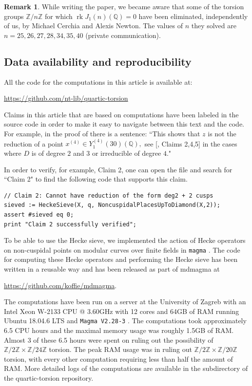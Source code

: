 \documentclass[11pt,reqno]{amsart}
\DeclareMathOperator{\rk}{rk}
\theoremstyle{definition}
\newtheorem{remark}[theorem]{Remark}
\numberwithin{equation}{section}
\newcommand{\Q}{\mathbb{Q}}
\def\torz#1{\mathbb Z /#1 \mathbb Z}
\def\tg#1#2{\mathbb Z/#1\mathbb Z \times \mathbb Z /#2 \mathbb Z}
\newcommand{\githubbare}[1]{\href{https://github.com/nt-lib/quartic-torsion/blob/main/#1}{\path{#1}}}
\newcommand{\github}[2]{[\githubbare{#1}, #2]}
\begin{document}
\begin{remark}
    While writing the paper, we became aware that some of the torsion groups $\torz{n}$ for which $\rk J_1(n)(\Q)=0$ have been eliminated, independently of us, by Michael Cerchia and Alexis Newton.  The values of $n$ they solved are $n=25, 26, 27, 28, 34, 35, 40$ (private communication).
\end{remark}




\subsection{Data availability and reproducibility}
All the code for the computations in this article is available at: 

\begin{center} \url{https://github.com/nt-lib/quartic-torsion} \end{center}

Claims in this article that are based on computations have been labeled in the source code in order to make it easy to navigate between this text and the code.
 For example, in the proof of  there is a sentence: ``This shows that $z$
    is not the reduction of a point $x^{(4)}\in Y_1^{(4)}(30)(\Q),$ see \github{X1_30.m}{Claims 2,4,5} in the cases where $D$ is of degree $2$ and $3$ or irreducible of degree $4$."
 
 In order to verify, for example, Claim 2, one can open the file \githubbare{X1_30.m} and search for ``Claim 2" to find the following code that supports this claim.
{\small
 \begin{verbatim}
// Claim 2: Cannot have reduction of the form deg2 + 2 cusps
sieved := HeckeSieve(X, q, NoncuspidalPlacesUpToDiamond(X,2));
assert #sieved eq 0;
print "Claim 2 successfully verified";
\end{verbatim}
 }

 To be able to use the Hecke sieve, we implemented the action of Hecke operators on non-cuspidal points on modular curves over finite fields in \texttt{magma} \cite{magma}. The code for computing these Hecke operators and performing the Hecke sieve has been written in a reusable way and has been released as part of mdmagma  at \begin{center} \url{https://github.com/koffie/mdmagma}. \end{center} 

The computations have been run on a server at the University of Zagreb with an Intel Xeon W-2133 CPU @ 3.60GHz with 12 cores and 64GB of RAM running Ubuntu 18.04.6 LTS and \texttt{Magma V2.28-3} \cite{magma}.
The computations took approximately 6.5 CPU hours and the maximal memory usage was roughly 1.5GB of RAM. Almost 3 of these 6.5 hours were spent on ruling out the possibility of $\tg{2}{24}$ torsion. The peak RAM usage was in ruling out $\tg{2}{20}$ torsion, with every other computation requiring less than half the amount of RAM.
More detailed logs of the computations are available in the \githubbare{logs} subdirectory of the quartic-torsion repository. 
\end{document}
